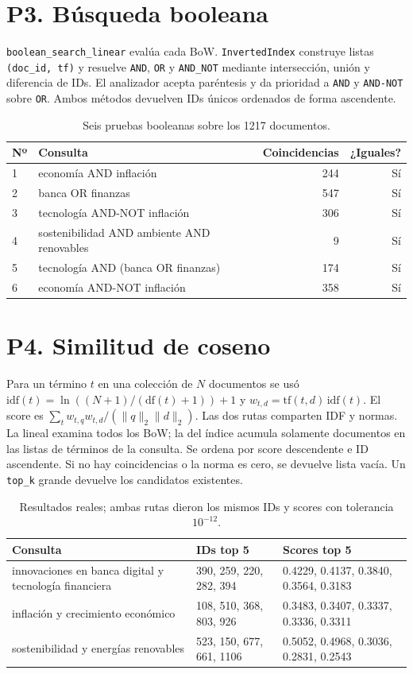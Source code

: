 \documentclass[11pt,a4paper]{article}
\newcommand{\codigo}[1]{\texttt{#1}}
\begin{document}
\section{P3. Búsqueda booleana}
\codigo{boolean\_search\_linear} evalúa cada BoW. \codigo{InvertedIndex}
construye listas \codigo{(doc\_id, tf)} y resuelve \codigo{AND}, \codigo{OR}
y \codigo{AND\_NOT} mediante intersección, unión y diferencia de IDs. El analizador
acepta paréntesis y da prioridad a \codigo{AND} y \codigo{AND-NOT} sobre
\codigo{OR}. Ambos métodos devuelven IDs únicos ordenados de forma ascendente.
\begin{table}[H]\centering\small
\begin{tabular}{p{0.6cm}p{8.8cm}rr}\toprule
Nº & Consulta & Coincidencias & ¿Iguales?\\\midrule
1 & economía AND inflación & 244 & Sí \\
2 & banca OR finanzas & 547 & Sí \\
3 & tecnología AND-NOT inflación & 306 & Sí \\
4 & sostenibilidad AND ambiente AND renovables & 9 & Sí \\
5 & tecnología AND (banca OR finanzas) & 174 & Sí \\
6 & economía AND-NOT inflación & 358 & Sí \\
\bottomrule\end{tabular}
\caption{Seis pruebas booleanas sobre los 1217 documentos.}
\end{table}

\section{P4. Similitud de coseno}
Para un término $t$ en una colección de $N$ documentos se usó
$\mathrm{idf}(t)=\ln((N+1)/(\mathrm{df}(t)+1))+1$ y
$w_{t,d}=\mathrm{tf}(t,d)\,\mathrm{idf}(t)$.
El score es $\sum_t w_{t,q}w_{t,d}/(\lVert q\rVert_2\lVert d\rVert_2)$.
Las dos rutas comparten IDF y normas. La lineal examina todos los BoW; la del
índice acumula solamente documentos en las listas de términos de la consulta.
Se ordena por score descendente e ID ascendente. Si no hay coincidencias o la
norma es cero, se devuelve lista vacía. Un \codigo{top\_k} grande devuelve los
candidatos existentes.
\begin{table}[H]\centering\footnotesize
\begin{tabular}{p{4.5cm}p{4.2cm}p{5cm}}\toprule
Consulta & IDs top 5 & Scores top 5\\\midrule
innovaciones en banca digital y tecnología financiera & 390, 259, 220, 282, 394 & 0.4229, 0.4137, 0.3840, 0.3564, 0.3183 \\
inflación y crecimiento económico & 108, 510, 368, 803, 926 & 0.3483, 0.3407, 0.3337, 0.3336, 0.3311 \\
sostenibilidad y energías renovables & 523, 150, 677, 661, 1106 & 0.5052, 0.4968, 0.3036, 0.2831, 0.2543 \\
\bottomrule\end{tabular}
\caption{Resultados reales; ambas rutas dieron los mismos IDs y scores con tolerancia $10^{-12}$.}
\end{table}
\end{document}
